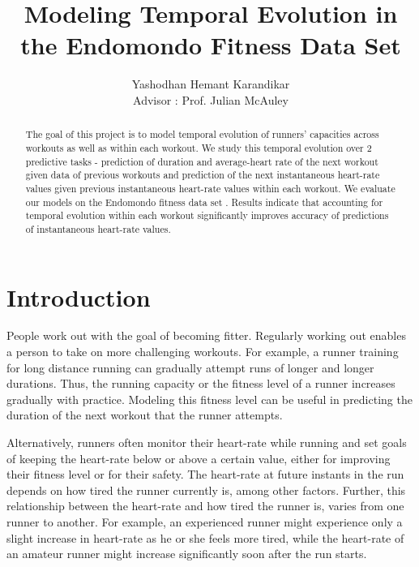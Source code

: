 \documentclass{acm_proc_article-sp}
\begin{document}
\title{Modeling Temporal Evolution in the Endomondo Fitness Data Set}
%
%
\author{
\alignauthor
Yashodhan Hemant Karandikar\\
\bigskip
       {Advisor : Prof. Julian McAuley}
}


\maketitle
\begin{abstract}
The goal of this project is to model temporal evolution of runners' capacities across workouts as well as within each workout. We study this temporal evolution over 2 predictive tasks - prediction of duration and average-heart rate of the next workout given data of previous workouts and prediction of the next instantaneous heart-rate values given previous instantaneous heart-rate values within each workout. We evaluate our models on the Endomondo fitness data set \cite{endomondo}. Results indicate that accounting for temporal evolution within each workout significantly improves accuracy of predictions of instantaneous heart-rate values.
\end{abstract}




\section{Introduction}
People work out with the goal of becoming fitter. Regularly working out enables a person to take on more challenging workouts. For example, a runner training for long distance running can gradually attempt runs of longer and longer durations. Thus, the running capacity or the fitness level of a runner increases gradually with practice. Modeling this fitness level can be useful in predicting the duration of the next workout that the runner attempts.

Alternatively, runners often monitor their heart-rate while running and set goals of keeping the heart-rate below or above a certain value, either for improving their fitness level or for their safety. The heart-rate at future instants in the run depends on how tired the runner currently is, among other factors. Further, this relationship between the heart-rate and how tired the runner is, varies from one runner to another. For example, an experienced runner might experience only a slight increase in heart-rate as he or she feels more tired, while the heart-rate of an amateur runner might increase significantly soon after the run starts.
\end{document}
